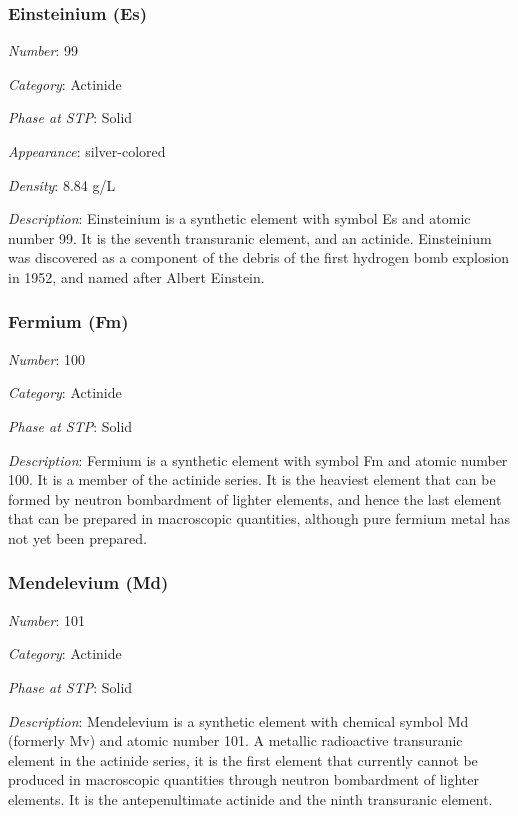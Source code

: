 \documentclass{article}
\begin{document}
\hypertarget{subsubsection::Es}{}\subsubsection{Einsteinium (Es)}

\textit{Number}: 99

\textit{Category}: Actinide

\textit{Phase at STP}: Solid

\textit{Appearance}: silver-colored

\textit{Density}: 8.84 g/L

\textit{Description}: Einsteinium is a synthetic element with symbol Es and atomic number 99. It is the seventh transuranic element, and an actinide. Einsteinium was discovered as a component of the debris of the first hydrogen bomb explosion in 1952, and named after Albert Einstein.

\hypertarget{subsubsection::Fm}{}\subsubsection{Fermium (Fm)}

\textit{Number}: 100

\textit{Category}: Actinide

\textit{Phase at STP}: Solid

\textit{Description}: Fermium is a synthetic element with symbol Fm and atomic number 100. It is a member of the actinide series. It is the heaviest element that can be formed by neutron bombardment of lighter elements, and hence the last element that can be prepared in macroscopic quantities, although pure fermium metal has not yet been prepared.

\hypertarget{subsubsection::Md}{}\subsubsection{Mendelevium (Md)}

\textit{Number}: 101

\textit{Category}: Actinide

\textit{Phase at STP}: Solid

\textit{Description}: Mendelevium is a synthetic element with chemical symbol Md (formerly Mv) and atomic number 101. A metallic radioactive transuranic element in the actinide series, it is the first element that currently cannot be produced in macroscopic quantities through neutron bombardment of lighter elements. It is the antepenultimate actinide and the ninth transuranic element.
\end{document}
